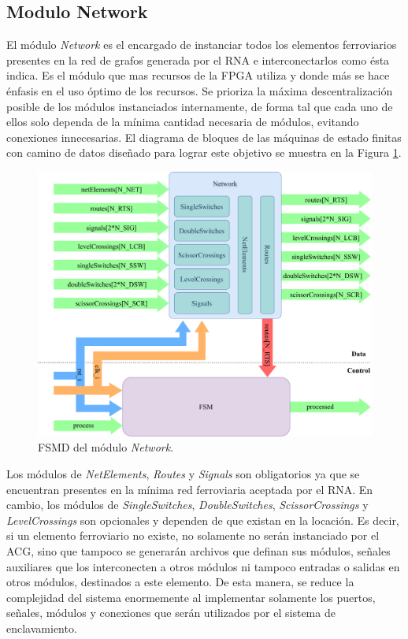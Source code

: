 \subsection{Modulo Network}
	\label{sec:network}
	
	El módulo \textit{Network} es el encargado de instanciar todos los elementos ferroviarios presentes en la red de grafos generada por el RNA e interconectarlos como ésta indica. Es el módulo que mas recursos de la FPGA utiliza y donde más se hace énfasis en el uso óptimo de los recursos. Se prioriza la máxima descentralización posible de los módulos instanciados internamente, de forma tal que cada uno de ellos solo dependa de la mínima cantidad necesaria de módulos, evitando conexiones innecesarias. El diagrama de bloques de las máquinas de estado finitas con camino de datos diseñado para lograr este objetivo se muestra en la Figura \ref{fig:Network_module}.
	
	\begin{figure}[H]
		\centering
		\includegraphics[width=1\textwidth]{Figuras/Network_module.png}
		\centering\caption{FSMD del módulo \textit{Network}.}
		\label{fig:Network_module}
	\end{figure}
	
	Los módulos de \textit{NetElements}, \textit{Routes} y \textit{Signals} son obligatorios ya que se encuentran presentes en la mínima red ferroviaria aceptada por el RNA. En cambio, los módulos de \textit{SingleSwitches}, \textit{DoubleSwitches}, \textit{ScissorCrossings} y \textit{LevelCrossings} son opcionales y dependen de que existan en la locación. Es decir, si un elemento ferroviario no existe, no solamente no serán instanciado por el ACG, sino que tampoco se generarán archivos que definan sus módulos, señales auxiliares que los interconecten a otros módulos ni tampoco entradas o salidas en otros módulos, destinados a este elemento. De esta manera, se reduce la complejidad del sistema enormemente al implementar solamente los puertos, señales, módulos y conexiones que serán utilizados por el sistema de enclavamiento.
	

